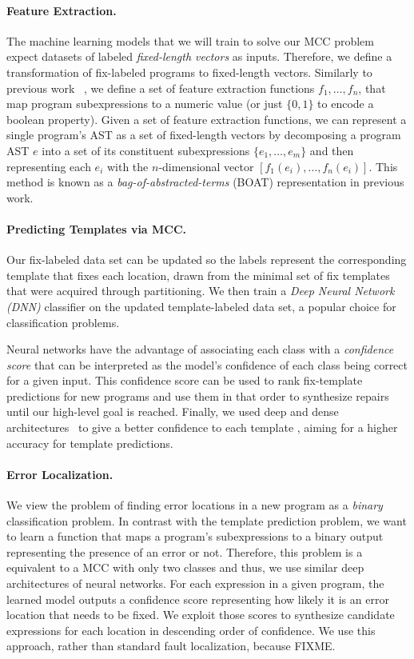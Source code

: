 \paragraph{Feature Extraction.} The machine learning models that we will train to
solve our MCC problem expect datasets of labeled \emph{fixed-length vectors} as
inputs. Therefore, we define a transformation of fix-labeled programs to
fixed-length vectors. Similarly to previous work ~\citep{Seidel:2017}, we define
a set of feature extraction functions $f_1, \ldots, f_n$, that map program
subexpressions to a numeric value (or just $\{0, 1\}$ to encode a boolean
property). Given a set of feature extraction functions, we can represent a
single program's AST as a set of fixed-length vectors by decomposing a program
AST $e$ into a set of its constituent subexpressions $\{e_1, \ldots, e_m\}$ and
then representing each $e_i$ with the $n$-dimensional vector $[f_1(e_i), \ldots,
f_n(e_i)]$. This method is known as a \emph{bag-of-abstracted-terms} (BOAT)
representation in previous work.

\paragraph{Predicting Templates via MCC.}
Our fix-labeled data set can be updated so the labels represent the
corresponding template that fixes each location, drawn from the minimal set of
fix templates that were acquired through partitioning. We then train a
\emph{Deep Neural Network (DNN)} classifier on the updated template-labeled data
set, a popular choice for classification problems.

Neural networks have the advantage of associating each class with a
\emph{confidence score} that can be interpreted as the model's confidence of
each class being correct for a given input. This confidence score can be
used to rank fix-template predictions for new programs and use them in that
order to synthesize repairs until our high-level goal is reached. Finally, we
used deep and dense architectures~\cite{FIXME} to give a better confidence
to each template
,
aiming for a higher accuracy for template predictions.

\paragraph{Error Localization.} We view the problem of finding error locations in a
new program as a \emph{binary} classification problem. In contrast with the
template prediction problem, we want to learn a function that maps a program's
subexpressions to a binary output representing the presence of an error or not.
Therefore, this problem is a equivalent to a MCC with only two classes and thus,
we use similar deep architectures of neural networks. For each expression in a
given program, the learned model outputs
a confidence score representing how likely it is an error location
that needs to be fixed. We exploit those scores to synthesize candidate
expressions for each location in descending order of confidence. We use
this approach, rather than standard fault localization, because FIXME.

